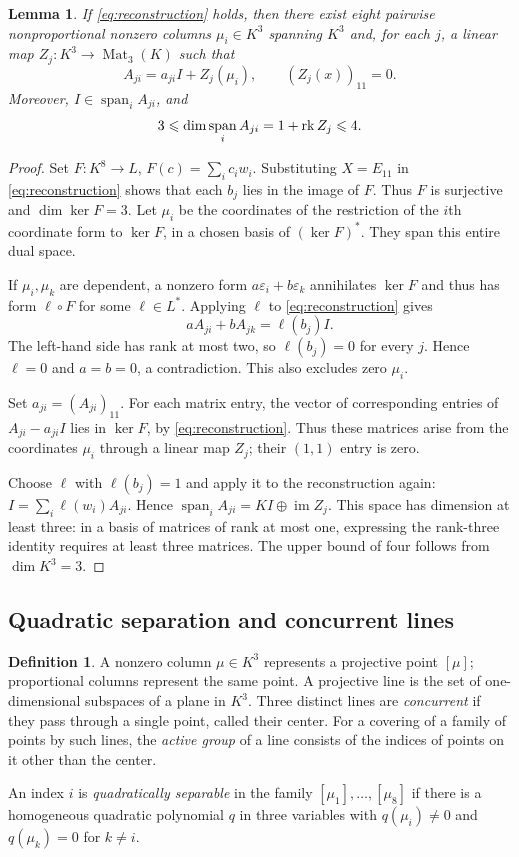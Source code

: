 \documentclass[11pt,a4paper]{article}
\numberwithin{equation}{section}
\theoremstyle{plain}
\newtheorem{lemma}[theorem]{Lemma}
\theoremstyle{definition}
\newtheorem{definition}[theorem]{Definition}
\DeclareMathOperator{\im}{im}\DeclareMathOperator{\supp}{supp}
\DeclareMathOperator{\Mat}{Mat}\DeclareMathOperator{\Span}{span}
\newcommand{\leqs}{\leqslant}\newcommand{\geqs}{\geqslant}
\begin{document}
\begin{lemma}\label{lem:kernel-model}
If \eqref{eq:reconstruction} holds, then there exist eight pairwise
nonproportional nonzero columns $\mu_i\in K^3$ spanning $K^3$ and,
for each $j$, a linear map $Z_j:K^3\to\Mat_3(K)$ such that
\[
 A_{ji}=a_{ji}I+Z_j(\mu_i),\qquad (Z_j(x))_{11}=0.
\]
Moreover, $I\in\Span_i A_{ji}$, and
\[
 3\leqs\dim\Span_i A_{ji}=1+\rk Z_j\leqs4.
\]
\end{lemma}
\begin{proof}
Set $F:K^8\to L$, $F(c)=\sum_i c_iw_i$.
Substituting $X=E_{11}$ in \eqref{eq:reconstruction} shows that each
$b_j$ lies in the image of $F$. Thus $F$ is surjective and
$\dim\ker F=3$. Let $\mu_i$ be the coordinates of the restriction
of the $i$th coordinate form to $\ker F$, in a chosen basis of
$(\ker F)^*$. They span this entire dual space.

If $\mu_i,\mu_k$ are dependent, a nonzero form
$a\varepsilon_i+b\varepsilon_k$ annihilates $\ker F$ and thus has
form $\ell\circ F$ for some $\ell\in L^*$.
Applying $\ell$ to \eqref{eq:reconstruction} gives
\[
 aA_{ji}+bA_{jk}=\ell(b_j)I.
\]
The left-hand side has rank at most two, so $\ell(b_j)=0$ for every
$j$. Hence $\ell=0$ and $a=b=0$, a contradiction.
This also excludes zero $\mu_i$.

Set $a_{ji}=(A_{ji})_{11}$. For each matrix entry, the vector of
corresponding entries of $A_{ji}-a_{ji}I$ lies in $\ker F$, by
\eqref{eq:reconstruction}. Thus these matrices arise from the
coordinates $\mu_i$ through a linear map $Z_j$; their $(1,1)$ entry
is zero.

Choose $\ell$ with $\ell(b_j)=1$ and apply it to the reconstruction
again: $I=\sum_i\ell(w_i)A_{ji}$. Hence
$\Span_i A_{ji}=KI\oplus\im Z_j$.
This space has dimension at least three: in a basis of matrices of
rank at most one, expressing the rank-three identity requires at
least three matrices. The upper bound of four follows from
$\dim K^3=3$.
\end{proof}

\subsection{Quadratic separation and concurrent lines}

\begin{definition}
A nonzero column $\mu\in K^3$ represents a projective point $[\mu]$;
proportional columns represent the same point. A projective line is
the set of one-dimensional subspaces of a plane in $K^3$.
Three distinct lines are \emph{concurrent} if they pass through a
single point, called their center. For a covering of a family of
points by such lines, the \emph{active group} of a line consists of
the indices of points on it other than the center.

An index $i$ is \emph{quadratically separable} in the family
$[\mu_1],\ldots,[\mu_8]$ if there is a homogeneous quadratic
polynomial $q$ in three variables with $q(\mu_i)\ne0$ and
$q(\mu_k)=0$ for $k\ne i$.
\end{definition}
\end{document}
